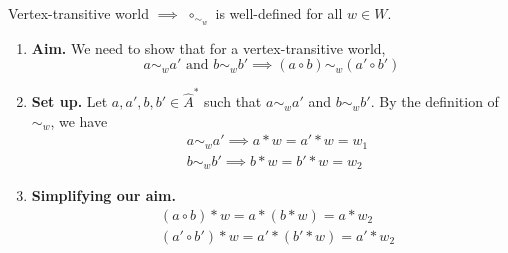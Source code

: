 \begin{propositionE}
    Vertex-transitive world $\implies$ $\circ_{\sim_{w}}$ is well-defined for all $w \in W$.
\end{propositionE}
\begin{proofE}
\begin{enumerate}
    \item \textbf{Aim.}
    We need to show that for a vertex-transitive world,
    \begin{equation}
        a \sim_{w} a' \text{ and } b \sim_{w} b' \implies (a \circ b) \sim_{w} (a' \circ b')
    \end{equation}

    \item \textbf{Set up.}
    Let $a, a', b, b' \in \hat{A}^{*}$ such that $a \sim_{w} a'$ and $b \sim_{w} b'$.
    By the definition of $\sim_{w}$, we have
    \begin{align}
        & a \sim_{w} a' \implies a \ast w = a' \ast w = w_{1} \\
        & b \sim_{w} b' \implies b \ast w = b' \ast w = w_{2}
    \end{align}

    \item \textbf{Simplifying our aim.}
    \begin{align}
        & (a \circ b) \ast w = a \ast (b \ast w) = a \ast w_{2} \\
        & (a' \circ b') \ast w = a' \ast (b' \ast w) = a' \ast w_{2}
    \end{align}


\end{enumerate}
\end{proofE}
